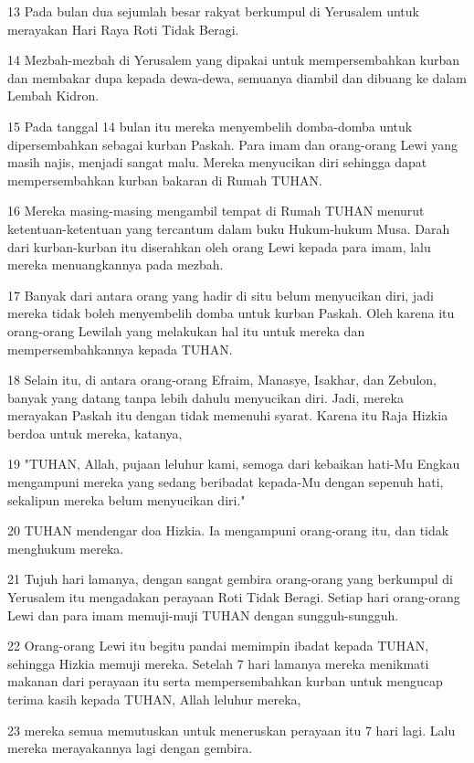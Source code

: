 \par 13 Pada bulan dua sejumlah besar rakyat berkumpul di Yerusalem untuk merayakan Hari Raya Roti Tidak Beragi.
\par 14 Mezbah-mezbah di Yerusalem yang dipakai untuk mempersembahkan kurban dan membakar dupa kepada dewa-dewa, semuanya diambil dan dibuang ke dalam Lembah Kidron.
\par 15 Pada tanggal 14 bulan itu mereka menyembelih domba-domba untuk dipersembahkan sebagai kurban Paskah. Para imam dan orang-orang Lewi yang masih najis, menjadi sangat malu. Mereka menyucikan diri sehingga dapat mempersembahkan kurban bakaran di Rumah TUHAN.
\par 16 Mereka masing-masing mengambil tempat di Rumah TUHAN menurut ketentuan-ketentuan yang tercantum dalam buku Hukum-hukum Musa. Darah dari kurban-kurban itu diserahkan oleh orang Lewi kepada para imam, lalu mereka menuangkannya pada mezbah.
\par 17 Banyak dari antara orang yang hadir di situ belum menyucikan diri, jadi mereka tidak boleh menyembelih domba untuk kurban Paskah. Oleh karena itu orang-orang Lewilah yang melakukan hal itu untuk mereka dan mempersembahkannya kepada TUHAN.
\par 18 Selain itu, di antara orang-orang Efraim, Manasye, Isakhar, dan Zebulon, banyak yang datang tanpa lebih dahulu menyucikan diri. Jadi, mereka merayakan Paskah itu dengan tidak memenuhi syarat. Karena itu Raja Hizkia berdoa untuk mereka, katanya,
\par 19 "TUHAN, Allah, pujaan leluhur kami, semoga dari kebaikan hati-Mu Engkau mengampuni mereka yang sedang beribadat kepada-Mu dengan sepenuh hati, sekalipun mereka belum menyucikan diri."
\par 20 TUHAN mendengar doa Hizkia. Ia mengampuni orang-orang itu, dan tidak menghukum mereka.
\par 21 Tujuh hari lamanya, dengan sangat gembira orang-orang yang berkumpul di Yerusalem itu mengadakan perayaan Roti Tidak Beragi. Setiap hari orang-orang Lewi dan para imam memuji-muji TUHAN dengan sungguh-sungguh.
\par 22 Orang-orang Lewi itu begitu pandai memimpin ibadat kepada TUHAN, sehingga Hizkia memuji mereka. Setelah 7 hari lamanya mereka menikmati makanan dari perayaan itu serta mempersembahkan kurban untuk mengucap terima kasih kepada TUHAN, Allah leluhur mereka,
\par 23 mereka semua memutuskan untuk meneruskan perayaan itu 7 hari lagi. Lalu mereka merayakannya lagi dengan gembira.
